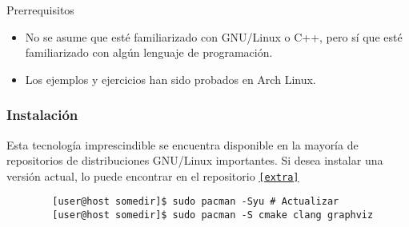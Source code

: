 \begin{frame}[fragile]
\begin{block}{Prerrequisitos}
\begin{itemize}
			\item

			No se asume que esté familiarizado con GNU/Linux o C++,
			pero sí que esté familiarizado con algún lenguaje de
			programación.
			
			\item

			Los ejemplos y ejercicios han sido probados en Arch
			Linux.
		\end{itemize}
	\end{block}
\end{frame}

\begin{frame}[fragile]
	\frametitle{Instalación}
	Esta tecnología imprescindible se encuentra disponible en la
	mayoría de repositorios de distribuciones GNU/Linux importantes.
	Si desea instalar una versión actual, lo puede encontrar en el
	repositorio \href{https://archlinux.org/packages/extra/x86_64/cmake}{\lstinline{[extra]}}

	\begin{verbatim}
		[user@host somedir]$ sudo pacman -Syu # Actualizar
		[user@host somedir]$ sudo pacman -S cmake clang graphviz
	\end{verbatim}
\end{frame}


